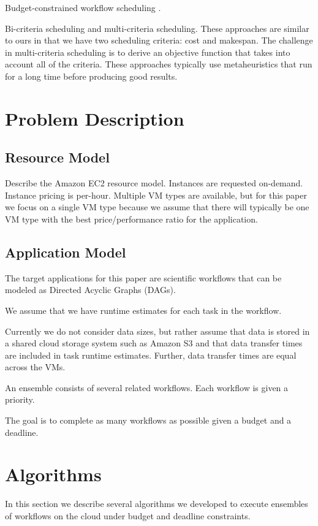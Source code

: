 \documentclass{sig-alternate}
\begin{document}
Budget-constrained workflow scheduling \cite{Sakellariou2007}.

Bi-criteria scheduling and multi-criteria scheduling. These approaches are similar to ours in that we have two scheduling criteria: cost and makespan. The challenge in multi-criteria scheduling is to derive an objective function that takes into account all of the criteria. These approaches typically use metaheuristics that run for a long time before producing good results.

\section{Problem Description}
\subsection{Resource Model}
Describe the Amazon EC2 resource model. Instances are requested on-demand. Instance pricing is per-hour. Multiple VM types are available, but for this paper we focus on a single VM type because we assume that there will typically be one VM type with the best price/performance ratio for the application.

\subsection{Application Model}
The target applications for this paper are scientific workflows that can be modeled as Directed Acyclic Graphs (DAGs).

We assume that we have runtime estimates for each task in the workflow.

Currently we do not consider data sizes, but rather assume that data is stored in a shared cloud storage system such as Amazon S3 and that data transfer times are included in task runtime estimates. Further, data transfer times are equal across the VMs.

An ensemble consists of several related workflows. Each workflow is given a priority.

The goal is to complete as many workflows as possible given a budget and a deadline.


\section{Algorithms}

In this section we describe several algorithms we developed to execute ensembles of
workflows on the cloud under budget and deadline constraints.
\end{document}
